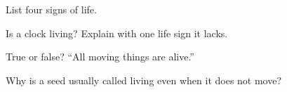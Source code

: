 \begin{exercise}[$\star$]\label{exo:g2:what-alive:2}
List four signs of life.
\end{exercise}

\begin{exercise}[$\star$]\label{exo:g2:what-alive:3}
Is a clock living? Explain with one life sign it lacks.
\end{exercise}

\begin{exercise}[$\star$]\label{exo:g2:what-alive:4}
True or false? ``All moving things are alive.''
\end{exercise}

\begin{exercise}[$\star\star$]\label{exo:g2:what-alive:5}
Why is a seed usually called living even when it does not move?
\end{exercise}

